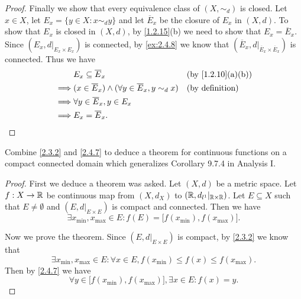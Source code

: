 \begin{proof}
  Finally we show that every equivalence class of \((X, \sim_d)\) is closed.
  Let \(x \in X\), let \(E_x = \{y \in X : x \sim_d y\}\) and let \(\overline{E}_x\) be the closure of \(E_x\) in \((X, d)\).
  To show that \(E_x\) is closed in \((X, d)\), by \cref{1.2.15}(b) we need to show that \(E_x = \overline{E}_x\).
  Since \((E_x, d|_{E_x \times E_x})\) is connected, by \cref{ex:2.4.8} we know that \((\overline{E}_x, d|_{\overline{E}_x \times \overline{E}_x})\) is connected.
  Thus we have
  \begin{align*}
             & E_x \subseteq \overline{E}_x                                            &  & \text{(by \cref{1.2.10}(a)(b))} \\
    \implies & (x \in \overline{E}_x) \land (\forall y \in \overline{E}_x, y \sim_d x) &  & \text{(by definition)}          \\
    \implies & \forall y \in \overline{E}_x, y \in E_x                                                                      \\
    \implies & E_x = \overline{E}_x.
  \end{align*}
\end{proof}

\begin{ex}\label{ex:2.4.10}
  Combine \cref{2.3.2} and \cref{2.4.7} to deduce a theorem for continuous functions on a compact connected domain which generalizes Corollary 9.7.4 in Analysis I.
\end{ex}

\begin{proof}
  First we deduce a theorem was asked.
  Let \((X, d)\) be a metric space.
  Let \(f : X \to \mathbb{R}\) be continuous map from \((X, d_X)\) to \((\mathbb{R}, d_{l^1}|_{\mathbb{R} \times \mathbb{R}})\).
  Let \(E \subseteq X\) such that \(E \neq \emptyset\) and \((E, d|_{E \times E})\) is compact and connected.
  Then we have
  \[
    \exists x_{\min}, x_{\max} \in E : f(E) = \big[f(x_{\min}), f(x_{\max})\big].
  \]

  Now we prove the theorem.
  Since \((E, d|_{E \times E})\) is compact, by \cref{2.3.2} we know that
  \[
    \exists x_{\min}, x_{\max} \in E : \forall x \in E, f(x_{\min}) \leq f(x) \leq f(x_{\max}).
  \]
  Then by \cref{2.4.7} we have
  \[
    \forall y \in \big[f(x_{\min}), f(x_{\max})\big], \exists x \in E : f(x) = y.
  \]
\end{proof}